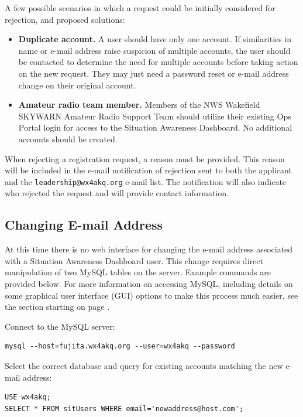 \documentclass[pdflatex,letterpaper,twoside,12pt]{book}
\begin{document}
A few possible scenarios in which a request could be initially considered for rejection, and proposed solutions:

\begin{itemize}
\item {\bf Duplicate account.}  A user should have only one account.  If similarities in name or e-mail address raise suspicion of multiple accounts, the user should be contacted to determine the need for multiple accounts before taking action on the new request.  They may just need a password reset or e-mail address change on their original account.
\item {\bf Amateur radio team member.}  Members of the NWS Wakefield SKYWARN Amateur Radio Support Team should utilize their existing Ops Portal login for access to the Situation Awareness Dashboard.  No additional accounts should be created.
\end{itemize}

When rejecting a registration request, a reason must be provided.  This reason will be included in the e-mail notification of rejection sent to both the applicant and the \verb|leadership@wx4akq.org| e-mail list.  The notification will also indicate who rejected the request and will provide contact information.

\subsection{Changing E-mail Address}

At this time there is no web interface for changing the e-mail address associated with a Situation Awareness Dashboard user.  This change requires direct manipulation of two MySQL tables on the server.  Example commands are provided below.  For more information on accessing MySQL, including details on some graphical user interface (GUI) options to make this process much easier, see the  section starting on page \pageref{database-server}.

Connect to the MySQL server:

\begin{verbatim}
mysql --host=fujita.wx4akq.org --user=wx4akq --password
\end{verbatim}

Select the correct database and query for existing accounts matching the new e-mail address:

\begin{verbatim}
USE wx4akq;
SELECT * FROM sitUsers WHERE email='newaddress@host.com';
\end{verbatim}
\end{document}
